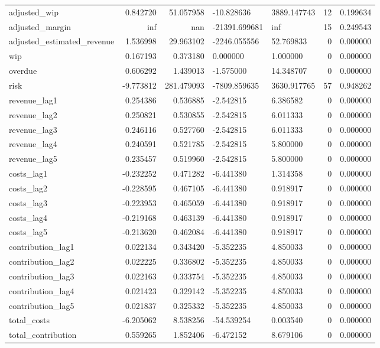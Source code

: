 \begin{landscape}
\begin{longtable}[h!]{lrrllrr}
adjusted_wip & 0.842720 & 51.057958 & -10.828636 & 3889.147743 & 12 & 0.199634 \\
adjusted_margin & inf & nan & -21391.699681 & inf & 15 & 0.249543 \\
adjusted_estimated_revenue & 1.536998 & 29.963102 & -2246.055556 & 52.769833 & 0 & 0.000000 \\
wip & 0.167193 & 0.373180 & 0.000000 & 1.000000 & 0 & 0.000000 \\
overdue & 0.606292 & 1.439013 & -1.575000 & 14.348707 & 0 & 0.000000 \\
risk & -9.773812 & 281.479093 & -7809.859635 & 3630.917765 & 57 & 0.948262 \\
revenue_lag1 & 0.254386 & 0.536885 & -2.542815 & 6.386582 & 0 & 0.000000 \\
revenue_lag2 & 0.250821 & 0.530855 & -2.542815 & 6.011333 & 0 & 0.000000 \\
revenue_lag3 & 0.246116 & 0.527760 & -2.542815 & 6.011333 & 0 & 0.000000 \\
revenue_lag4 & 0.240591 & 0.521785 & -2.542815 & 5.800000 & 0 & 0.000000 \\
revenue_lag5 & 0.235457 & 0.519960 & -2.542815 & 5.800000 & 0 & 0.000000 \\
costs_lag1 & -0.232252 & 0.471282 & -6.441380 & 1.314358 & 0 & 0.000000 \\
costs_lag2 & -0.228595 & 0.467105 & -6.441380 & 0.918917 & 0 & 0.000000 \\
costs_lag3 & -0.223953 & 0.465059 & -6.441380 & 0.918917 & 0 & 0.000000 \\
costs_lag4 & -0.219168 & 0.463139 & -6.441380 & 0.918917 & 0 & 0.000000 \\
costs_lag5 & -0.213620 & 0.462084 & -6.441380 & 0.918917 & 0 & 0.000000 \\
contribution_lag1 & 0.022134 & 0.343420 & -5.352235 & 4.850033 & 0 & 0.000000 \\
contribution_lag2 & 0.022225 & 0.336802 & -5.352235 & 4.850033 & 0 & 0.000000 \\
contribution_lag3 & 0.022163 & 0.333754 & -5.352235 & 4.850033 & 0 & 0.000000 \\
contribution_lag4 & 0.021423 & 0.329142 & -5.352235 & 4.850033 & 0 & 0.000000 \\
contribution_lag5 & 0.021837 & 0.325332 & -5.352235 & 4.850033 & 0 & 0.000000 \\
total_costs & -6.205062 & 8.538256 & -54.539254 & 0.003540 & 0 & 0.000000 \\
total_contribution & 0.559265 & 1.852406 & -6.472152 & 8.679106 & 0 & 0.000000 \\

\end{longtable}
\end{landscape}
